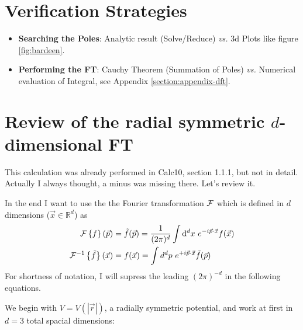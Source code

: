 \documentclass[10pt,a4paper, fleqn]{article}
\begin{document}
\newpage
\begin{appendices}
\section{Verification Strategies}
\begin{itemize}
 \item {\bf Searching the Poles}: Analytic result (Solve/Reduce) {\it vs.} 3d Plots like figure \ref{fig:bardeen}.
 \item {\bf Performing the FT}: Cauchy Theorem (Summation of Poles) {\it vs.} Numerical evaluation of Integral, see Appendix \ref{section:appendix-dft}.
\end{itemize}

\section{Review of the radial symmetric $d$-dimensional FT} \label{appendix:fourier}
This calculation was already performed in Calc10, section 1.1.1, but not in detail. Actually I always thought, a minus was missing there. Let's review it.

In the end I want to use the the Fourier transformation ${\cal F}$ which is defined in $d$ dimensions ($\vec x \in \mathbb R^d$) as
%
\begin{subequations}
\begin{align}
{\cal F}\left\{ f \right\}(\vec p) &= \tilde f(\vec p) = \frac 1{(2\pi)^d} \int \mathrm{d}^d x~e^{-i\vec p \cdot \vec x} f(\vec x) \label{eq:Four1} \\
{\cal F}^{-1}\left\{ \tilde f \right\}(\vec x) &= f(\vec x) =   \int d^d p~e^{+i \vec p \cdot \vec x} \tilde f(\vec p) \label{eq:Four2}
\end{align}
\end{subequations}
%
For shortness of notation, I will supress the leading $(2\pi)^{-d}$ in the following equations.

We begin with $V=V(|\vec r|)$, a radially symmetric potential, and work at first in $d=3$ total spacial dimensions:


\end{appendices}
\end{document}
